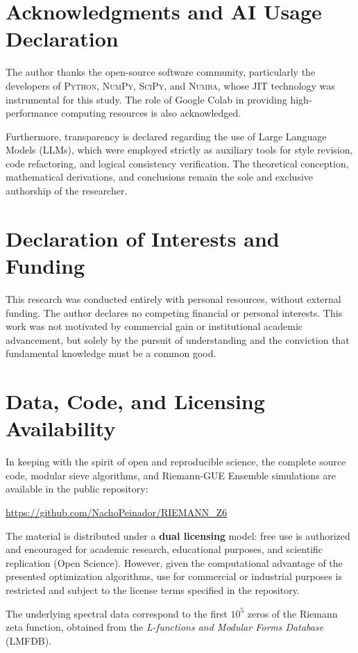 \documentclass[12pt, a4paper]{article}
\theoremstyle{plain}
\theoremstyle{definition}
\theoremstyle{remark}
\begin{document}
\section*{Acknowledgments and AI Usage Declaration}
The author thanks the open-source software community, particularly the developers of \textsc{Python}, \textsc{NumPy}, \textsc{SciPy}, and \textsc{Numba}, whose JIT technology was instrumental for this study. The role of Google Colab in providing high-performance computing resources is also acknowledged.

Furthermore, transparency is declared regarding the use of Large Language Models (LLMs), which were employed strictly as auxiliary tools for style revision, code refactoring, and logical consistency verification. The theoretical conception, mathematical derivations, and conclusions remain the sole and exclusive authorship of the researcher.

\section*{Declaration of Interests and Funding}
This research was conducted entirely with personal resources, without external funding. The author declares no competing financial or personal interests. This work was not motivated by commercial gain or institutional academic advancement, but solely by the pursuit of understanding and the conviction that fundamental knowledge must be a common good.

\section*{Data, Code, and Licensing Availability}
In keeping with the spirit of open and reproducible science, the complete source code, modular sieve algorithms, and Riemann-GUE Ensemble simulations are available in the public repository:
\begin{center}
\url{https://github.com/NachoPeinador/RIEMANN_Z6}
\end{center}
The material is distributed under a \textbf{dual licensing} model: free use is authorized and encouraged for academic research, educational purposes, and scientific replication (Open Science). However, given the computational advantage of the presented optimization algorithms, use for commercial or industrial purposes is restricted and subject to the license terms specified in the repository.

The underlying spectral data correspond to the first $10^5$ zeros of the Riemann zeta function, obtained from the \textit{L-functions and Modular Forms Database} (LMFDB).
\end{document}
